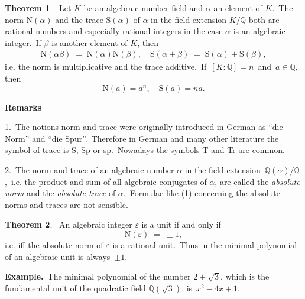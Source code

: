 \documentclass[12pt]{article}
\theoremstyle{definition}
\newtheorem{thmplain}{Theorem}
\begin{document}
\begin{thmplain}
\, Let $K$ be an algebraic number field and $\alpha$ an element of $K$.\, The norm  $\mbox{N}(\alpha)$ and the trace $\mbox{S}(\alpha)$ of $\alpha$ in the field extension $K/\mathbb{Q}$ both are rational numbers and especially rational integers in the case $\alpha$ is an algebraic integer.\, If $\beta$ is another element of $K$, then 
\begin{align}
\mbox{N}(\alpha\beta) \;=\; \mbox{N}(\alpha)\mbox{N}(\beta), \quad
  \mbox{S}(\alpha\!+\!\beta) \;=\; \mbox{S}(\alpha)\!+\!\mbox{S}(\beta),
\end{align}
i.e. the norm is multiplicative and the trace additive.\, If\,  
$[K\!:\!\mathbb{Q}] = n$\, and\, $a\in\mathbb{Q}$, then
$$\mbox{N}(a) = a^n, \quad \mbox{S}(a) = na.$$
\end{thmplain}

\textbf{Remarks}

1.\, The notions norm and trace were originally introduced in German  as ``die Norm'' and ``die Spur''.\, Therefore in German and many other literature the symbol of trace is S, Sp or sp.\, Nowadays the symbols T and Tr are common. 

2.\, The norm and trace of an algebraic number $\alpha$ in the field extension\, $\mathbb{Q}(\alpha)/\mathbb{Q}$,\, i.e. the product and sum of all algebraic conjugates of $\alpha$, are called the {\em absolute norm} and the {\em absolute trace} of $\alpha$.\, Formulae like (1) concerning the absolute norms and traces are not sensible.\, 

\begin{thmplain}
\, An algebraic integer $\varepsilon$ is a unit if and only if 
        $$\mbox{N}(\varepsilon) \;=\; \pm 1,$$
i.e. iff the absolute norm of $\varepsilon$ is a rational unit.\, Thus  in the minimal polynomial of an algebraic unit is always \,$\pm 1$.
\end{thmplain}

\textbf{Example.}\, The minimal polynomial of the number $2\!+\!\sqrt{3}$, which is the fundamental unit of the quadratic field $\mathbb{Q}(\sqrt{3})$, is \,$x^2\!-\!4x\!+\!1$.
\end{document}
